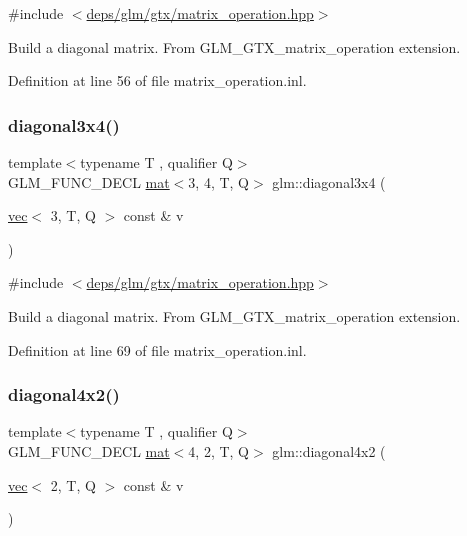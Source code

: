 {\ttfamily \#include $<$\hyperlink{matrix__operation_8hpp}{deps/glm/gtx/matrix\+\_\+operation.\+hpp}$>$}

Build a diagonal matrix. From G\+L\+M\+\_\+\+G\+T\+X\+\_\+matrix\+\_\+operation extension. 

Definition at line 56 of file matrix\+\_\+operation.\+inl.

\mbox{\label{group__gtx__matrix__operation_gad7551139cff0c4208d27f0ad3437833e}} 
\subsubsection{\texorpdfstring{diagonal3x4()}{diagonal3x4()}}
{\footnotesize\ttfamily template$<$typename T , qualifier Q$>$ \\
G\+L\+M\+\_\+\+F\+U\+N\+C\+\_\+\+D\+E\+CL \hyperlink{structglm_1_1mat}{mat}$<$3, 4, T, Q$>$ glm\+::diagonal3x4 (\begin{DoxyParamCaption}\item[{\hyperlink{structglm_1_1vec}{vec}$<$ 3, T, Q $>$ const \&}]{v }\end{DoxyParamCaption})}



{\ttfamily \#include $<$\hyperlink{matrix__operation_8hpp}{deps/glm/gtx/matrix\+\_\+operation.\+hpp}$>$}

Build a diagonal matrix. From G\+L\+M\+\_\+\+G\+T\+X\+\_\+matrix\+\_\+operation extension. 

Definition at line 69 of file matrix\+\_\+operation.\+inl.

\mbox{\label{group__gtx__matrix__operation_gacb8969e6543ba775c6638161a37ac330}} 
\subsubsection{\texorpdfstring{diagonal4x2()}{diagonal4x2()}}
{\footnotesize\ttfamily template$<$typename T , qualifier Q$>$ \\
G\+L\+M\+\_\+\+F\+U\+N\+C\+\_\+\+D\+E\+CL \hyperlink{structglm_1_1mat}{mat}$<$4, 2, T, Q$>$ glm\+::diagonal4x2 (\begin{DoxyParamCaption}\item[{\hyperlink{structglm_1_1vec}{vec}$<$ 2, T, Q $>$ const \&}]{v }\end{DoxyParamCaption})}



